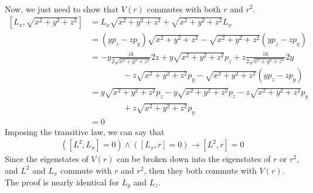 \documentclass[11pt]{article}
\begin{document}
\begin{enumerate}[label=\alph*)]
\begin{align*}
\end{align*}
Now, we just need to show that $V(r)$ commutes with both $r$ and $r^2$. 
\begin{align*}
\left[L_x, \sqrt{x^2+y^2+z^2}\right] & = L_x\sqrt{x^2+y^2+z^2} + \sqrt{x^2+y^2+z^2}L_x \\
& = (yp_z - zp_y)\sqrt{x^2+y^2+z^2} - \sqrt{x^2+y^2+z^2}(yp_z - zp_y)\\
& = -y\frac{i\hbar}{2\sqrt{x^2+y^2+z^2}}2z + y\sqrt{x^2+y^2+z^2}p_z + z\frac{i\hbar}{2\sqrt{x^2+y^2+z^2}}2y \\
& \hspace{4em} - z\sqrt{x^2+y^2+z^2}p_y -\sqrt{x^2+y^2+z^2}(yp_z - zp_y)\\
& = y\sqrt{x^2+y^2+z^2}p_z - y\sqrt{x^2+y^2+z^2}p_z - z\sqrt{x^2+y^2+z^2}p_y \\
& \hspace{4em} + z\sqrt{x^2+y^2+z^2}p_y\\
&=0
\end{align*}
Imposing the transitive law, we can say that 
\begin{align*}
\left(\left[L^2, L_x\right]=0\right) \land \left(\left[L_x, r\right] =0 \right)\longrightarrow \left[L^2, r\right] = 0
\end{align*}
Since the eigenstates of $V(r)$ can be broken down into the eigenstates of $r$ or $r^2$, and $L^2$ and $L_x$ commute with $r$ and $r^2$, then they both commute with $V(r)$. The proof is nearly identical for $L_y$ and $L_z$. 
\end{enumerate}

\newpage
\end{document}
